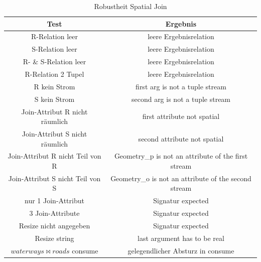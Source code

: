 \documentclass[a4paper,12pt,twoside]{article}
\begin{document}
{\begin{table}
	\centering
	\begin{tabular}{|c|c|}
		\hline 
		Test & Ergebnis \\ 
		\hline
		R-Relation leer & leere Ergebnisrelation \\ 
		\hline
		S-Relation leer & leere Ergebnisrelation \\ 
		\hline
		R- \& S-Relation leer & leere Ergebnisrelation \\ 
		\hline
		R-Relation 2 Tupel & leere Ergebnisrelation \\ 
		\hline
		R kein Strom & first arg is not a tuple stream \\ 
		\hline
		S kein Strom & second arg is not a tuple stream \\ 
		\hline
		Join-Attribut R nicht räumlich & first attribute not spatial \\ 
		\hline
		Join-Attribut S nicht räumlich & second attribute not spatial \\ 
		\hline
		Join-Attribut R nicht Teil von R & Geometry\_p is not an attribute of the first stream \\ 
		\hline
		Join-Attribut S nicht Teil von S & Geometry\_o is not an attribute of the second stream \\ 
		\hline
		nur 1 Join-Attribut & Signatur expected \\
		\hline
		3 Join-Attribute &  Signatur expected \\
		\hline
		Resize nicht angegeben & Signatur expected \\ 
		\hline
		Resize string & last argument has to be real \\ 
		\hline
		$waterways \bowtie roads$ consume & gelegendlicher Absturz in consume \\
		\hline
	\end{tabular}
	\caption{\label{tab:testSpatialRobust}Robustheit Spatial Join}
\end{table}

}
\end{document}

